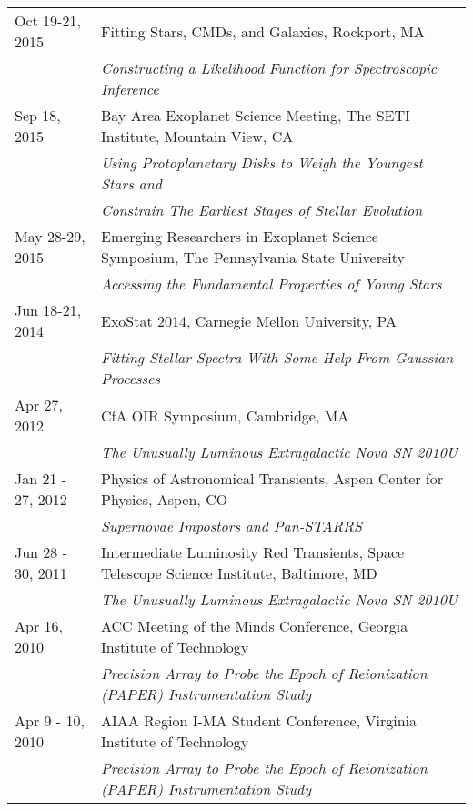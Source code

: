 \begin{longtable}{@{\hspace{10pt}}p{1.2in}l}
  Oct 19-21, 2015 & Fitting Stars, CMDs, and Galaxies, Rockport, MA \\
  & \emph{Constructing a Likelihood Function for Spectroscopic Inference}\\[\rowskip]
  Sep 18, 2015 & Bay Area Exoplanet Science Meeting, The SETI Institute, Mountain View, CA \\
  & \emph{Using Protoplanetary Disks to Weigh the Youngest Stars and} \\
  & \emph{Constrain The Earliest Stages of Stellar Evolution} \\[\rowskip]
  May 28-29, 2015 & Emerging Researchers in Exoplanet Science Symposium, The Pennsylvania State University\\
  & \emph{Accessing the Fundamental Properties of Young Stars} \\[\rowskip]
  Jun 18-21, 2014 & ExoStat 2014, Carnegie Mellon University, PA \\
  & \emph{Fitting Stellar Spectra With Some Help From Gaussian Processes} \\[\rowskip]
  Apr 27, 2012 & CfA OIR Symposium, Cambridge, MA \\
  & \emph{The Unusually Luminous Extragalactic Nova SN 2010U}\\
  Jan 21 - 27, 2012 & Physics of Astronomical Transients, Aspen Center for Physics, Aspen, CO \\
  & \emph{Supernovae Impostors and Pan-STARRS} \\[\rowskip]
  Jun 28 - 30, 2011 & Intermediate Luminosity Red Transients, Space Telescope Science Institute, Baltimore, MD\\
  & \emph{The Unusually Luminous Extragalactic Nova SN 2010U} \\[\rowskip]
  Apr 16, 2010 & ACC Meeting of the Minds Conference, Georgia Institute of Technology \\
  & \emph{Precision Array to Probe the Epoch of Reionization (PAPER) Instrumentation Study} \\[\rowskip]
  Apr 9 - 10, 2010 &  AIAA Region I-MA Student Conference, Virginia Institute of Technology\\
  & \emph{Precision Array to Probe the Epoch of Reionization (PAPER) Instrumentation Study} \\[\rowskip]
\end{longtable}
